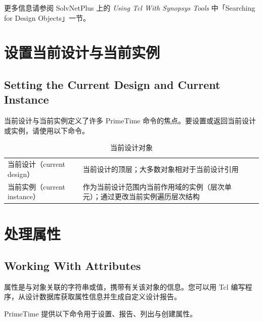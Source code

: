更多信息请参阅 SolvNetPlus 上的 \textit{Using Tcl With Synopsys Tools} 中「Searching for Design Objects」一节。

\section{设置当前设计与当前实例}
\subsection*{Setting the Current Design and Current Instance}

当前设计与当前实例定义了许多 PrimeTime 命令的焦点。要设置或返回当前设计或实例，请使用以下命令。

\begin{table}[htbp]
\centering
\caption{当前设计对象}\label{tab:current-design}
\begin{tabular}{|L{0.14\textwidth}|L{0.42\textwidth}|L{0.32\textwidth}|}
\hline
{} &  &  \\
\hline
当前设计（current design） &
当前设计的顶层；大多数对象相对于当前设计引用 &
 \\
\hline
当前实例（current instance） &
作为当前设计范围内当前作用域的实例（层次单元）；通过更改当前实例遍历层次结构 &
 \\
\hline
\end{tabular}
\end{table}

\section{处理属性}
\subsection*{Working With Attributes}

属性是与对象关联的字符串或值，携带有关该对象的信息。您可以用 Tcl 编写程序，从设计数据库获取属性信息并生成自定义设计报告。

PrimeTime 提供以下命令用于设置、报告、列出与创建属性。

